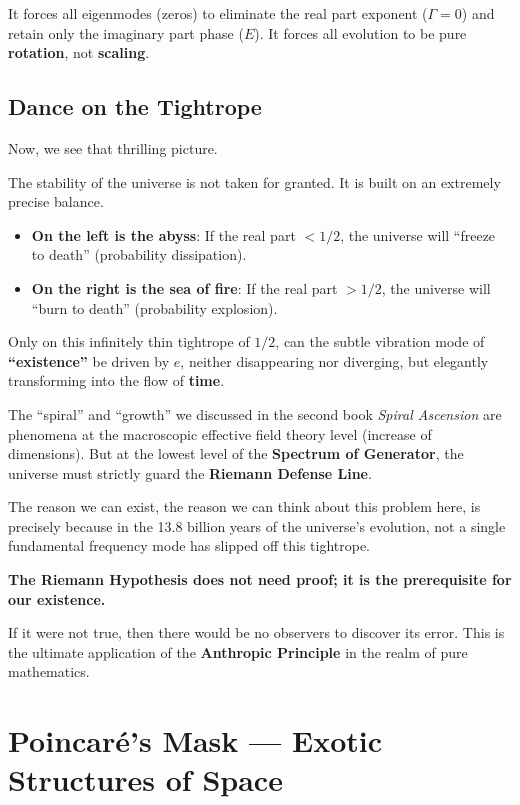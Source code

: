 It forces all eigenmodes (zeros) to eliminate the real part exponent ($\Gamma=0$) and retain only the imaginary part phase ($E$). It forces all evolution to be pure \textbf{rotation}, not \textbf{scaling}.

\subsection{Dance on the Tightrope}

Now, we see that thrilling picture.

The stability of the universe is not taken for granted. It is built on an extremely precise balance.

\begin{itemize}
\item \textbf{On the left is the abyss}: If the real part $< 1/2$, the universe will ``freeze to death'' (probability dissipation).

\item \textbf{On the right is the sea of fire}: If the real part $> 1/2$, the universe will ``burn to death'' (probability explosion).
\end{itemize}

Only on this infinitely thin tightrope of \textbf{$1/2$}, can the subtle vibration mode of \textbf{``existence''} be driven by $e$, neither disappearing nor diverging, but elegantly transforming into the flow of \textbf{time}.

The ``spiral'' and ``growth'' we discussed in the second book \emph{Spiral Ascension} are phenomena at the macroscopic effective field theory level (increase of dimensions). But at the lowest level of the \textbf{Spectrum of Generator}, the universe must strictly guard the \textbf{Riemann Defense Line}.

The reason we can exist, the reason we can think about this problem here, is precisely because in the 13.8 billion years of the universe's evolution, not a single fundamental frequency mode has slipped off this tightrope.

\textbf{The Riemann Hypothesis does not need proof; it is the prerequisite for our existence.}

If it were not true, then there would be no observers to discover its error. This is the ultimate application of the \textbf{Anthropic Principle} in the realm of pure mathematics.

\section{Poincaré's Mask — Exotic Structures of Space}

